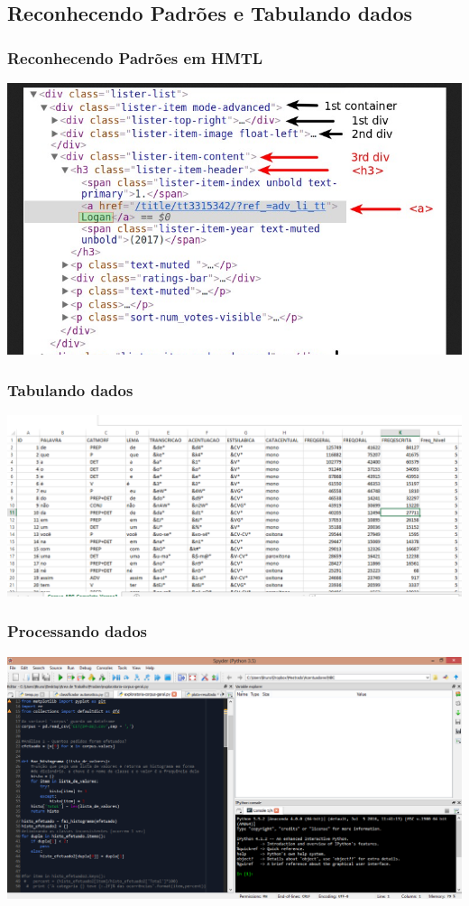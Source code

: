 \documentclass{beamer}
\begin{document}
\subsection{Reconhecendo Padrões e Tabulando dados}

\begin{frame}
\frametitle{Reconhecendo Padrões em HMTL}
\includegraphics[width=\textwidth]{NestedTags.png}
\end{frame}
\begin{frame}
\frametitle{Tabulando dados}
\includegraphics[width=\textwidth]{DadosTabulados.png}
\end{frame}

\begin{frame}
\frametitle{Processando dados}
\includegraphics[width=\textwidth]{spyder.png}
\end{frame}
\end{document}

